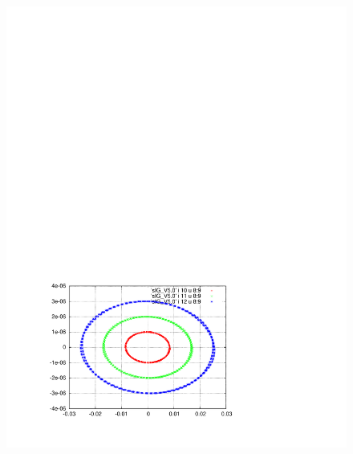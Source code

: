 \documentclass[]{article}
\begin{document}
%
\begin{figure}[h]
\begin{minipage}[b]{0.45\linewidth}
\centering
\includegraphics[scale=0.6]{pdf/delta_vs_ct_V5p0.pdf}
\end{minipage}
%
\begin{minipage}[b]{0.45\linewidth}
\centering

\end{minipage}
\end{figure}
\end{document}
